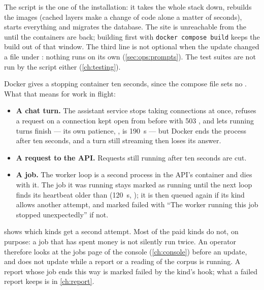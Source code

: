 The script is the one of the installation: it takes the whole stack down, rebuilds the
images (cached layers make a change of code alone a matter of seconds), starts everything
and migrates the database. The site is unreachable from the  until the containers
are back; building first with \texttt{docker compose build} keeps the build out of that window.
The third line is not optional when the update changed a file under
: nothing runs  on its own
(\cref{sec:ops:prompts}). The test suites are not run by the script either
(\cref{ch:testing}).

Docker gives a stopping container ten seconds, since the compose file sets no
. What that means for work in flight:

\begin{itemize}
  \item \textbf{A chat turn.} The assistant service stops taking connections at once, refuses
    a request on a connection kept open from before with 503 , and lets
    running turns finish --- its own patience,
    , is 190~s --- but Docker ends the process after ten seconds, and
    a turn still streaming then loses its answer.
  \item \textbf{A request to the API.} Requests still running after ten seconds are cut.
  \item \textbf{A job.} The worker loop is a second process in the API's container and dies
    with it. The job it was running stays marked as running until the next loop finds its
    heartbeat older than  (120~s, ); it is then queued
    again if its kind allows another attempt, and marked failed with \enquote{The worker
    running this job stopped unexpectedly} if not.
\end{itemize}

 shows which kinds get a second attempt. Most of the paid kinds do not, on
purpose: a job that has spent money is not silently run twice. An operator therefore looks at
the jobs page of the console (\cref{ch:console}) before an update, and does not update while
a report or a reading of the corpus is running. A report whose job ends this way is marked
failed by the kind's  hook; what a failed report keeps is in
\cref{ch:report}.


